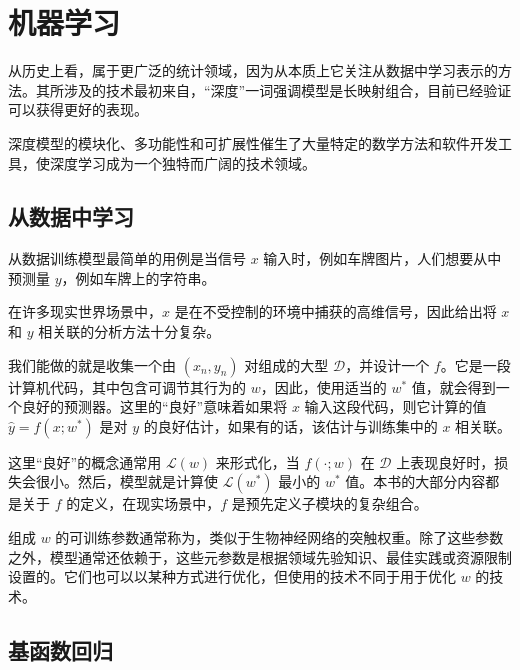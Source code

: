 \chapter{机器学习}\label{ch1}

从历史上看，属于更广泛的统计领域，因为从本质上它关注从数据中学习表示的方法。其所涉及的技术最初来自，``深度''一词强调模型是长映射组合，目前已经验证可以获得更好的表现。

深度模型的模块化、多功能性和可扩展性催生了大量特定的数学方法和软件开发工具，使深度学习成为一个独特而广阔的技术领域。

\section{从数据中学习}\label{sec1.1}

从数据训练模型最简单的用例是当信号 $x$ 输入时，例如车牌图片，人们想要从中预测量 $y$，例如车牌上的字符串。

在许多现实世界场景中，$x$ 是在不受控制的环境中捕获的高维信号，因此给出将 $x$ 和 $y$ 相关联的分析方法十分复杂。

我们能做的就是收集一个由 $(x_n, y_n)$ 对组成的大型 $\mathcal{D}$，并设计一个 $f$。它是一段计算机代码，其中包含可调节其行为的 $w$，因此，使用适当的 $w^*$ 值，就会得到一个良好的预测器。这里的``良好''意味着如果将 $x$ 输入这段代码，则它计算的值 $\hat{y}= f(x;w^*)$ 是对 $y$ 的良好估计，如果有的话，该估计与训练集中的 $x$ 相关联。

这里``良好''的概念通常用 $\mathcal{L}(w)$ 来形式化，当 $f(\cdot;w)$ 在 $\mathcal{D}$ 上表现良好时，损失会很小。然后，模型就是计算使 $\mathcal{L}(w^*)$ 最小的 $w^*$ 值。本书的大部分内容都是关于 $f$ 的定义，在现实场景中，$f$ 是预先定义子模块的复杂组合。

组成 $w$ 的可训练参数通常称为，类似于生物神经网络的突触权重。除了这些参数之外，模型通常还依赖于，这些元参数是根据领域先验知识、最佳实践或资源限制设置的。它们也可以以某种方式进行优化，但使用的技术不同于用于优化 $w$ 的技术。

\section{基函数回归}\label{sec1.2}

